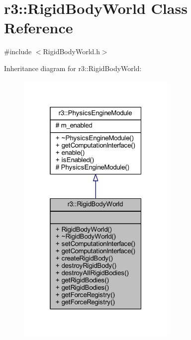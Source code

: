 \hypertarget{classr3_1_1_rigid_body_world}{}\section{r3\+:\+:Rigid\+Body\+World Class Reference}
\label{classr3_1_1_rigid_body_world}


{\ttfamily \#include $<$Rigid\+Body\+World.\+h$>$}



Inheritance diagram for r3\+:\+:Rigid\+Body\+World\+:\nopagebreak
\begin{figure}[H]
\begin{center}
\leavevmode
\includegraphics[width=217pt]{classr3_1_1_rigid_body_world__inherit__graph}
\end{center}
\end{figure}


